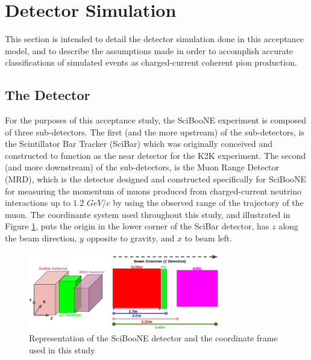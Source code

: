\documentclass[11pt]{article}
\begin{document}
\section{Detector Simulation}
\label{sec:simulation}
This section is intended to detail the detector simulation done in this acceptance model, and to describe the assumptions made in order to accomplish accurate classifications of simulated events as charged-current coherent pion production.

\subsection{The Detector}
\label{sub:detector}
For the purposes of this acceptance study, the SciBooNE experiment is composed of three sub-detectors. The first (and the more upstream) of the sub-detectors, is the Scintillator Bar Tracker (SciBar) which was originally conceived and constructed to function as the near detector for the K2K experiment. The second (and more downstream) of the sub-detectors, is the Muon Range Detector (MRD), which is the detector designed and constructed specifically for SciBooNE for measuring the momentum of muons produced from charged-current neutrino interactions up to $1.2$ $GeV/c$ by using the observed range of the trajectory of the muon. The coordinante system used throughout this study, and illustrated in  Figure \ref*{fig:SciBooNEDetector}, puts the origin in the lower corner of the SciBar detector, has $z$ along the beam direction, $y$ opposite to gravity, and $x$ to beam left. 

\begin{figure}[H]
\centering
\includegraphics[width=0.75\textwidth]{EventClassifications/SciBooNEDetector.png}
\caption{Representation of the SciBooNE detector and the coordinate frame used in this study}
\label{fig:SciBooNEDetector}
\end{figure}
\end{document}
